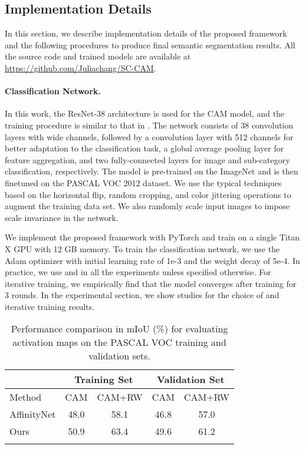 \documentclass[10pt,twocolumn,letterpaper]{article}
\begin{document}
\subsection{Implementation Details}
In this section, we describe implementation details of the proposed framework and the following procedures to produce final semantic segmentation results. 
All the source code and trained models are available at \url{https://github.com/Juliachang/SC-CAM}.




\paragraph{Classification Network.}
In this work, the ResNet-38 architecture \cite{wu2019wider} is used for the CAM model, and the training procedure is similar to that in \cite{ahn2018learning}.  
The network consists of 38 convolution layers with wide channels, followed by a  convolution layer with 512 channels for better adaptation to the classification task, a global average pooling layer for feature aggregation, and two fully-connected layers for image and sub-category classification, respectively.
The model is pre-trained on the ImageNet \cite{deng2009imagenet} and is then finetuned on the PASCAL VOC 2012 dataset.
We use the typical techniques based on the horizontal flip, random cropping, and color jittering operations to augment the training data set. 
We also randomly scale input images to impose scale invariance in the network.


We implement the proposed framework with PyTorch and train on a single Titan X GPU with 12 GB memory. 
To train the classification network, we use the Adam optimizer \cite{kingma2014adam} with initial learning rate of 1e-3 and the weight decay of 5e-4.
In practice, we use  and  in all the experiments unless specified otherwise.
For iterative training, we empirically find that the model converges after training for 3 rounds.
In the experimental section, we show studies for the choice of  and iterative training results.





\begin{table}[!t]
\caption{Performance comparison in mIoU (\%) for evaluating activation maps on the PASCAL VOC training and validation sets.}
	\vspace{-1mm}
	\small
	\centering
	\renewcommand{\arraystretch}{1.1}
	\setlength{\tabcolsep}{6pt}
	\begin{tabular}{lcc|cc}
		    \toprule
	        & \multicolumn{2}{c}{Training Set} & \multicolumn{2}{c}{Validation Set} \\
		    \midrule
		    Method & CAM & CAM+RW & CAM & CAM+RW \\
		    \midrule
		    AffinityNet \cite{ahn2018learning} & 48.0 & 58.1 & 46.8 & 57.0 \\
		    Ours & 50.9 & 63.4 & 49.6 & 61.2 \\
		\bottomrule
	\label{table: compare_cam}
	\end{tabular}
	\vspace{-8mm}
\end{table}
\end{document}
